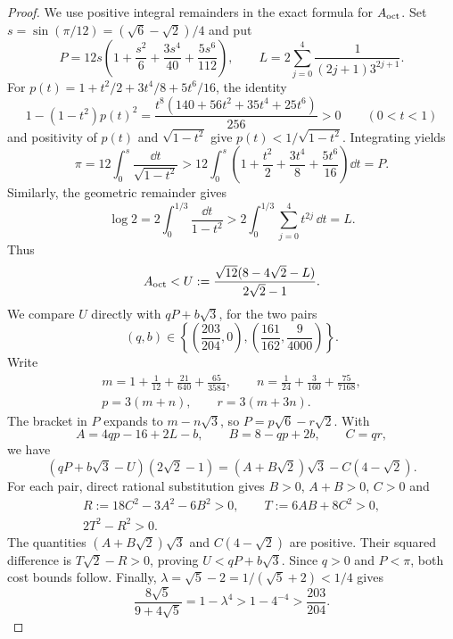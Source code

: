 \begin{proof}
We use positive integral remainders in the exact formula for $A_{\mathrm{oct}}$.
Set $s=\sin(\pi/12)=(\sqrt6-\sqrt2)/4$ and put
\[
 P=12s\left(1+\frac{s^2}{6}+\frac{3s^4}{40}+\frac{5s^6}{112}\right),\qquad
 L=2\sum_{j=0}^{4}\frac{1}{(2j+1)3^{2j+1}}.
\]
For $p(t)=1+t^2/2+3t^4/8+5t^6/16$, the identity
\[
 1-(1-t^2)p(t)^2
 =\frac{t^8(140+56t^2+35t^4+25t^6)}{256}>0
 \qquad(0<t<1)
\]
and positivity of $p(t)$ and $\sqrt{1-t^2}$ give
$p(t)<1/\sqrt{1-t^2}$. Integrating yields
\[
 \pi=12\int_0^s\frac{\dd t}{\sqrt{1-t^2}}
 >12\int_0^s\left(1+\frac{t^2}{2}+\frac{3t^4}{8}+\frac{5t^6}{16}\right)\dd t=P.
\]
Similarly, the geometric remainder gives
\[
 \log2=2\int_0^{1/3}\frac{\dd t}{1-t^2}
 >2\int_0^{1/3}\sum_{j=0}^4t^{2j}\,\dd t=L.
\]
Thus
\[
 A_{\mathrm{oct}}<U:=\frac{\sqrt{12}(8-4\sqrt2-L)}{2\sqrt2-1}.
\]
We compare $U$ directly with $qP+b\sqrt3$, for the two pairs
\[
 (q,b)\in\left\{\left(\frac{203}{204},0\right),
                       \left(\frac{161}{162},\frac9{4000}\right)\right\}.
\]
Write
\[
 \begin{gathered}
 m=1+\frac1{12}+\frac{21}{640}+\frac{65}{3584},\qquad
 n=\frac1{24}+\frac3{160}+\frac{75}{7168},\\
 p=3(m+n),\qquad r=3(m+3n).
 \end{gathered}
\]
The bracket in $P$ expands to $m-n\sqrt3$, so $P=p\sqrt6-r\sqrt2$.
With
\[
 A=4qp-16+2L-b,\qquad B=8-qp+2b,\qquad C=qr,
\]
we have
\[
 (qP+b\sqrt3-U)(2\sqrt2-1)=(A+B\sqrt2)\sqrt3-C(4-\sqrt2).
\]
For each pair, direct rational substitution gives $B>0$, $A+B>0$, $C>0$ and
\[
 \begin{gathered}
 R:=18C^2-3A^2-6B^2>0,\qquad T:=6AB+8C^2>0,\\
 2T^2-R^2>0.
 \end{gathered}
\]
The quantities $(A+B\sqrt2)\sqrt3$ and $C(4-\sqrt2)$ are positive.
Their squared difference is $T\sqrt2-R>0$, proving $U<qP+b\sqrt3$.
Since $q>0$ and $P<\pi$, both cost bounds follow.
Finally, $\lambda=\sqrt5-2=1/(\sqrt5+2)<1/4$ gives
\[
 \frac{8\sqrt5}{9+4\sqrt5}=1-\lambda^4
 >1-4^{-4}>\frac{203}{204}.
\]
\end{proof}
